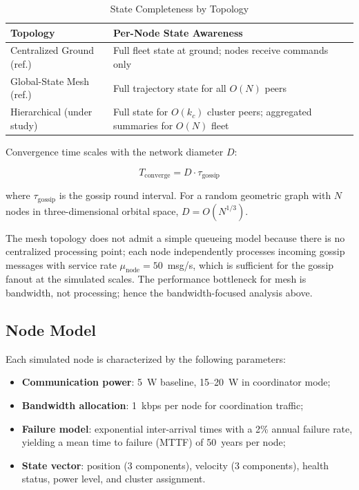 \documentclass[journal]{IEEEtran}
\begin{document}
\begin{table}[t]
    \centering
    \caption{State Completeness by Topology}
    \label{tab:state_completeness}
    \begin{tabular}{@{}lp{5.5cm}@{}}
        \toprule
        \textbf{Topology} & \textbf{Per-Node State Awareness} \\
        \midrule
        Centralized Ground (ref.)  & Full fleet state at ground; nodes receive commands only \\
        Global-State Mesh (ref.)   & Full trajectory state for all $O(N)$ peers \\
        Hierarchical (under study) & Full state for $O(k_c)$ cluster peers; aggregated summaries for $O(N)$ fleet \\
        \bottomrule
    \end{tabular}
\end{table}

Convergence time scales with the network diameter $D$:

\begin{equation}
    T_{\text{converge}} = D \cdot \tau_{\text{gossip}}
    \label{eq:mesh_convergence}
\end{equation}

\noindent where $\tau_{\text{gossip}}$ is the gossip round interval. For a random geometric graph with $N$ nodes in three-dimensional orbital space, $D = O(N^{1/3})$.

The mesh topology does not admit a simple queueing model because there is no centralized processing point; each node independently processes incoming gossip messages with service rate $\mu_{\text{node}} = 50$~msg/s, which is sufficient for the gossip fanout at the simulated scales. The performance bottleneck for mesh is bandwidth, not processing; hence the bandwidth-focused analysis above.

\subsection{Node Model}

Each simulated node is characterized by the following parameters:

\begin{itemize}
    \item \textbf{Communication power}: 5~W baseline, 15--20~W in coordinator mode;
    \item \textbf{Bandwidth allocation}: 1~kbps per node for coordination traffic;
    \item \textbf{Failure model}: exponential inter-arrival times with a 2\% annual failure rate, yielding a mean time to failure (MTTF) of 50~years per node;
    \item \textbf{State vector}: position (3 components), velocity (3 components), health status, power level, and cluster assignment.
\end{itemize}
\end{document}
